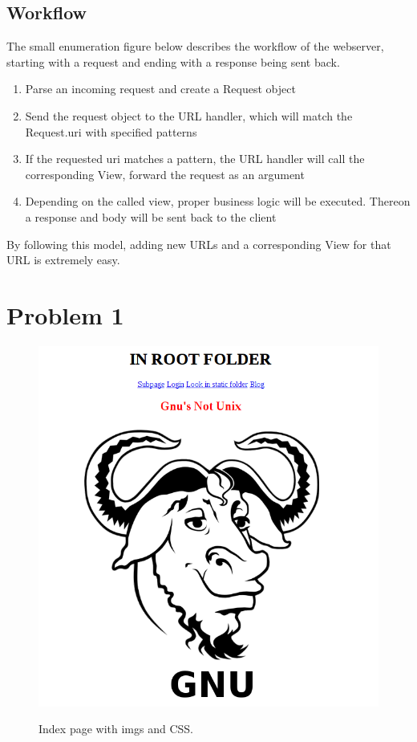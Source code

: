 \documentclass[a4paper,12pt]{article} %
\begin{document}
{\subsection{Workflow}

The small enumeration figure below describes the workflow of the webserver,
starting with a request and ending with a response being sent back.

\begin{enumerate}
  \item Parse an incoming request and create a Request object
  \item Send the request object to the URL handler, which will match the Request.uri with specified patterns
  \item If the requested uri matches a pattern, the URL handler will call the corresponding View, forward the request as an argument
  \item Depending on the called view, proper business logic will be executed. Thereon a response and body will be sent back to the client
\end{enumerate}

By following this model, adding new URLs and a corresponding View for that URL is extremely easy.\\

\section{Problem 1}

\begin{figure}[H]
    \centering  
    \includegraphics[scale=0.5]{img/screenshots/htmlindex.png}
	\label{fig:htmlindex}
	\caption{Index page with imgs and CSS.}
\end{figure}


}
\end{document}
